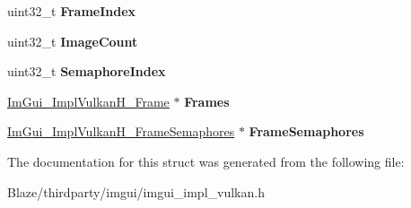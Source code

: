 \begin{DoxyCompactItemize}
uint32\+\_\+t {\bfseries Frame\+Index}
\item 
\mbox{\label{structImGui__ImplVulkanH__Window_ae4f91464af2252fd58640577da78c42c}} 
uint32\+\_\+t {\bfseries Image\+Count}
\item 
\mbox{\label{structImGui__ImplVulkanH__Window_a22de46dc435ae4cc3b198b0416bbb84b}} 
uint32\+\_\+t {\bfseries Semaphore\+Index}
\item 
\mbox{\label{structImGui__ImplVulkanH__Window_a6d363cd2fc5ffac4fd6d10b0d6864f8b}} 
\hyperlink{structImGui__ImplVulkanH__Frame}{Im\+Gui\+\_\+\+Impl\+Vulkan\+H\+\_\+\+Frame} $\ast$ {\bfseries Frames}
\item 
\mbox{\label{structImGui__ImplVulkanH__Window_aab4a967793cbf9680cff350a02c56026}} 
\hyperlink{structImGui__ImplVulkanH__FrameSemaphores}{Im\+Gui\+\_\+\+Impl\+Vulkan\+H\+\_\+\+Frame\+Semaphores} $\ast$ {\bfseries Frame\+Semaphores}
\end{DoxyCompactItemize}


The documentation for this struct was generated from the following file\+:\begin{DoxyCompactItemize}
\item 
Blaze/thirdparty/imgui/imgui\+\_\+impl\+\_\+vulkan.\+h\end{DoxyCompactItemize}
